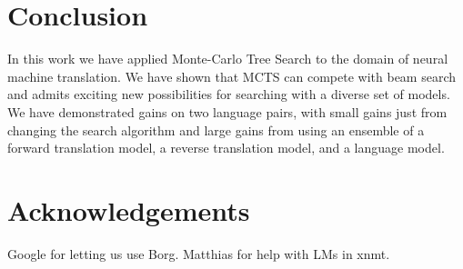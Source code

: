 \documentclass[11pt,a4paper]{article}
\begin{document}
\section{Conclusion}
In this work we have applied Monte-Carlo Tree Search to the domain of neural
machine translation.
We have shown that MCTS can compete with beam search and admits exciting new
possibilities for searching with a diverse set of models.
We have demonstrated gains on two language pairs, with small gains just from
changing the search algorithm and large gains from using an ensemble of a
forward translation model, a reverse translation model, and a language model.

\section*{Acknowledgements}
\label{sec:acknowledgements}
Google for letting us use Borg.
Matthias for help with LMs in xnmt.




\appendix
\end{document}

